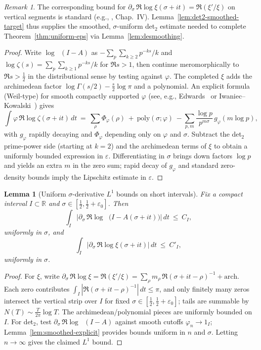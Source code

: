 \documentclass[11pt]{article}
\newtheorem{lemma}[theorem]{Lemma}
\theoremstyle{definition}
\theoremstyle{remark}
\newtheorem{remark}[theorem]{Remark}
\newcommand{\R}{\mathbb{R}}
\DeclareMathOperator{\dettwo}{det_2}
\begin{document}
\begin{remark}
The corresponding bound for \(\partial_\sigma\,\Re\log\xi(\sigma+it)=\Re(\xi'/\xi)\) on vertical segments is standard (e.g., \cite{TitchmarshZeta}, Chap.~IV). Lemma~\ref{lem:det2-smoothed-target} thus supplies the smoothed, \(\sigma\)-uniform det$_2$ estimate needed to complete Theorem~\ref{thm:uniform-eps} via Lemma~\ref{lem:desmoothing}.
\end{remark}
\begin{proof}
Write \(\log\dettwo(I-A)\) as \(-\sum_{p}\sum_{k\ge 2} p^{-ks}/k\) and \(\log\zeta(s)=\sum_{p}\sum_{k\ge 1} p^{-ks}/k\) for \(\Re s>1\), then continue meromorphically to \(\Re s>\tfrac12\) in the distributional sense by testing against \(\varphi\). The completed \(\xi\) adds the archimedean factor \(\log\Gamma(s/2)-\tfrac{s}{2}\log\pi\) and a polynomial. An explicit formula (Weil-type) for smooth compactly supported \(\varphi\) (see, e.g., Edwards~\cite[Ch.~1, §5]{Edwards} or Iwaniec--Kowalski~\cite[Ch.~5]{IwaniecKowalski}) gives
\[
 \int \varphi\,\Re\log\zeta(\sigma+it)\,dt\ =\ \sum_{\rho} \Phi_{\varphi}(\rho)\ +\ \text{poly}(\sigma;\varphi)\ -\sum_{p,m}\frac{\log p}{p^{m\sigma}}\,g_{\varphi}(m\log p),
\]
with \(g_{\varphi}\) rapidly decaying and \(\Phi_{\varphi}\) depending only on \(\varphi\) and \(\sigma\). Subtract the det$_2$ prime-power side (starting at \(k=2\)) and the archimedean terms of \(\xi\) to obtain a uniformly bounded expression in \(\varepsilon\). Differentiating in \(\sigma\) brings down factors \(\log p\) and yields an extra \(m\) in the zero sum; rapid decay of \(g_{\varphi}\) and standard zero-density bounds imply the Lipschitz estimate in \(\varepsilon\).
\end{proof}
\begin{lemma}[Uniform \(\sigma\)-derivative $L^1$ bounds on short intervals]\label{lem:uniform-derivative-L1}
Fix a compact interval \(I\subset\R\) and \(\sigma\in[\tfrac12,\tfrac12+\varepsilon_0]\). Then
\[
 \int_I \Big|\partial_\sigma\,\Re\log\dettwo\big(I-A(\sigma+it)\big)\Big|\,dt\ \le\ C_I,
\]
uniformly in \(\sigma\), and
\[
 \int_I \Big|\partial_\sigma\,\Re\log\xi(\sigma+it)\Big|\,dt\ \le\ C'_I,
\]
uniformly in \(\sigma\).
\end{lemma}
\begin{proof}
For \(\xi\), write \(\partial_\sigma\,\Re\log\xi=\Re(\xi'/\xi)=\sum_{\rho} m_{\rho}\,\Re(\sigma+it-\rho)^{-1}+\text{arch}\). Each zero contributes \(\int_I |\Re(\sigma+it-\rho)^{-1}|\,dt\le \pi\), and only finitely many zeros intersect the vertical strip over \(I\) for fixed \(\sigma\in[\tfrac12,\tfrac12+\varepsilon_0]\); tails are summable by \(N(T)\sim \tfrac{T}{2\pi}\log T\). The archimedean/polynomial pieces are uniformly bounded on \(I\). For det$_2$, test \(\partial_\sigma\,\Re\log\dettwo(I-A)\) against smooth cutoffs \(\varphi_n\to 1_I\); Lemma~\ref{lem:smoothed-explicit} provides bounds uniform in \(n\) and \(\sigma\). Letting \(n\to\infty\) gives the claimed \(L^1\) bound.
\end{proof}
\end{document}
